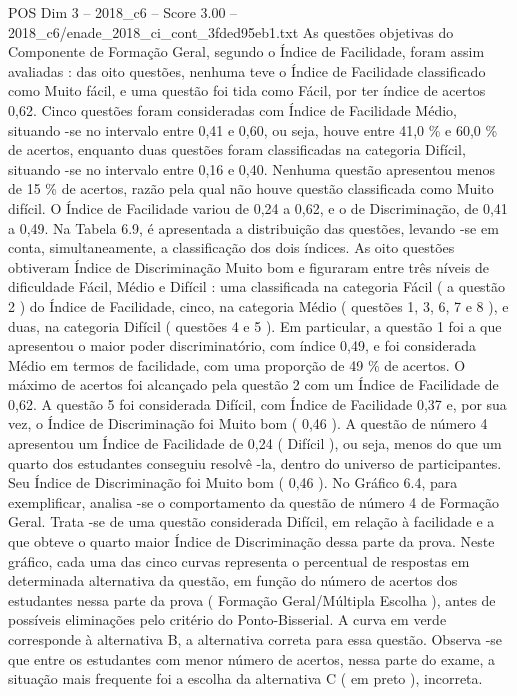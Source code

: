 \begin{textsample}{POS Dim 3 – 2018\_c6 – Score 3.00 – 2018\_c6/enade\_2018\_ci\_cont\_3fded95eb1.txt}
As questões objetivas do Componente de Formação Geral, segundo o Índice de Facilidade, foram assim avaliadas : das oito questões, nenhuma teve o Índice de Facilidade classificado como Muito fácil, e uma questão foi tida como Fácil, por ter índice de acertos 0,62.
Cinco questões foram consideradas com Índice de Facilidade Médio, situando -se no intervalo entre 0,41 e 0,60, ou seja, houve entre 41,0 \% e 60,0 \% de acertos, enquanto duas questões foram classificadas na categoria Difícil, situando -se no intervalo entre 0,16 e 0,40.
Nenhuma questão apresentou menos de 15 \% de acertos, razão pela qual não houve questão classificada como Muito difícil.
O Índice de Facilidade variou de 0,24 a 0,62, e o de Discriminação, de 0,41 a 0,49.
Na Tabela 6.9, é apresentada a distribuição das questões, levando -se em conta, simultaneamente, a classificação dos dois índices.
As oito questões obtiveram Índice de Discriminação Muito bom e figuraram entre três níveis de dificuldade Fácil, Médio e Difícil : uma classificada na categoria Fácil ( a questão 2 ) do Índice de Facilidade, cinco, na categoria Médio ( questões 1, 3, 6, 7 e 8 ), e duas, na categoria Difícil ( questões 4 e 5 ).
Em particular, a questão 1 foi a que apresentou o maior poder discriminatório, com índice 0,49, e foi considerada Médio em termos de facilidade, com uma proporção de 49 \% de acertos.
O máximo de acertos foi alcançado pela questão 2 com um Índice de Facilidade de 0,62.
A questão 5 foi considerada Difícil, com Índice de Facilidade 0,37 e, por sua vez, o Índice de Discriminação foi Muito bom ( 0,46 ).
A questão de número 4 apresentou um Índice de Facilidade de 0,24 ( Difícil ), ou seja, menos do que um quarto dos estudantes conseguiu resolvê -la, dentro do universo de participantes.
Seu Índice de Discriminação foi Muito bom ( 0,46 ).
No Gráfico 6.4, para exemplificar, analisa -se o comportamento da questão de número 4 de Formação Geral.
Trata -se de uma questão considerada Difícil, em relação à facilidade e a que obteve o quarto maior Índice de Discriminação dessa parte da prova.
Neste gráfico, cada uma das cinco curvas representa o percentual de respostas em determinada alternativa da questão, em função do número de acertos dos estudantes nessa parte da prova ( Formação Geral/Múltipla Escolha ), antes de possíveis eliminações pelo critério do Ponto-Bisserial.
A curva em verde corresponde à alternativa B, a alternativa correta para essa questão.
Observa -se que entre os estudantes com menor número de acertos, nessa parte do exame, a situação mais frequente foi a escolha da alternativa C ( em preto ), incorreta.

\end{textsample}
